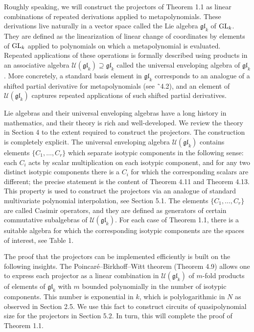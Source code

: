 \documentclass[10pt,a4paper]{article}
\begin{document}
Roughly speaking, we will construct the projectors of Theorem 1.1 as linear combinations of repeated derivations applied to metapolynomials. These derivations live naturally in a vector space called the Lie algebra $\mathfrak{gl}_{k}$ of $\textnormal{GL}_{k}$. They are defined as the linearization of linear change of coordinates by elements of $\textnormal{GL}_{k}$ applied to polynomials on which a metapolynomial is evaluated. Repeated applications of these operations is formally described using products in an associative algebra $\mathcal{U}(\mathfrak{gl}_{k})\supseteq\mathfrak{gl}_{k}$ called the universal enveloping algebra of $\mathfrak{gl}_{k}$.
More concretely, a standard basis element in $\mathfrak{gl}_{k}$ corresponds to an analogue of a shifted partial derivative for metapolynomials (see ˜4.2), and an element of $\mathcal{U}(\mathfrak{gl}_{k})$ captures repeated applications of such shifted partial derivatives.





Lie algebras and their universal enveloping algebras have a long history in mathematics, and their theory is rich and well-developed. We review the theory in Section 4 to the extent required to construct the projectors. The construction is completely explicit. The universal enveloping algebra $\mathcal{U}(\mathfrak{gl}_{k})$ contains elements $\{C_{1},\ldots,C_{r}\}$ which separate isotypic components in the following sense: each $C_{i}$ acts by scalar multiplication on each isotypic component, and for any two distinct isotypic components there is a $C_{i}$ for which the corresponding scalars are different; the precise statement is the content of Theorem 4.11 and Theorem 4.13. This property is used to construct the projectors via an analogue of standard multivariate polynomial interpolation, see Section 5.1. The elements $\{C_{1},\ldots,C_{r}\}$ are called Casimir operators, and they are defined as generators of certain commutative subalgebras of $\mathcal{U}(\mathfrak{gl}_{k})$. For each case of Theorem 1.1, there is a suitable algebra for which the corresponding isotypic components are the spaces of interest, see Table 1.





The proof that the projectors can be implemented efficiently is built on the following insights. The Poincaré–Birkhoff–Witt theorem (Theorem 4.9) allows one to express each projector as a linear combination in $\mathcal{U}(\mathfrak{gl}_{k})$ of $m$-fold products of elements of $\mathfrak{gl}_{k}$ with $m$ bounded polynomially in the number of isotypic components. This number is exponential in $k$, which is polylogarithmic in $N$ as observed in Section 2.5. We use this fact to construct circuits of quasipolynomial size for the projectors in Section 5.2. In turn, this will complete the proof of Theorem 1.1.
\end{document}
